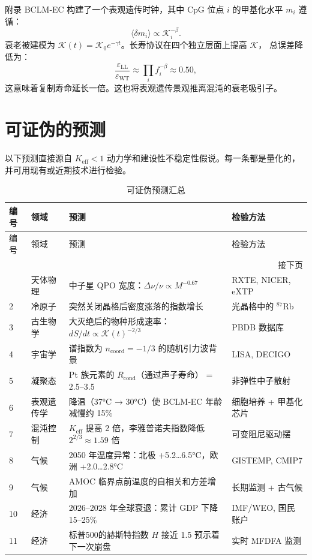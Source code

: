 \documentclass[12pt,a4paper]{article}
\newcommand{\Keff}{K_{\mathrm{eff}}}
\newcommand{\REL}{\mathcal{K}}
\begin{document}
	附录 BCLM‑EC 构建了一个表观遗传时钟，其中 CpG 位点 $i$ 的甲基化水平 $m_i$ 遵循：
	\[
	\langle \delta m_i \rangle \propto \REL_i^{-\beta}.
	\]
	衰老被建模为 $\REL(t) = \REL_0 e^{-\gamma t}$。长寿协议在四个独立层面上提高 $\REL$，
	总误差降低为：
	\[
	\frac{\varepsilon_{\mathrm{LL}}}{\varepsilon_{\mathrm{WT}}} \approx \prod_i f_i^{-\beta}
	\approx 0.50,
	\]
	这意味着复制寿命延长一倍。这也将表观遗传景观推离混沌的衰老吸引子。
	
	\section{可证伪的预测}
	
	以下预测直接源自 $\Keff < 1$ 动力学和建设性不稳定性假说。每一条都是量化的，
	并可用现有或近期技术进行检验。
	
	\begin{longtable}{|p{2cm}|p{3cm}|p{4.5cm}|p{4cm}|}
		\caption{可证伪预测汇总}\label{tab:predictions}\\
		\hline
		\textbf{编号} & \textbf{领域} & \textbf{预测} & \textbf{检验方法} \\
		\hline
		\endfirsthead
		\hline
		编号 & 领域 & 预测 & 检验方法 \\
		\hline
		\endhead
		\hline
		\multicolumn{4}{r}{接下页} \\
		\endfoot
		\hline
		\endlastfoot
		1 & 天体物理 & 中子星 QPO 宽度：$\Delta\nu/\nu \propto M^{-0.67}$ & RXTE, NICER, eXTP \\
		2 & 冷原子 & 突然关闭晶格后密度涨落的指数增长 & 光晶格中的 ${}^{87}$Rb \\
		3 & 古生物学 & 大灭绝后的物种形成速率：$dS/dt \propto \REL(t)^{-2/3}$ & PBDB 数据库 \\
		4 & 宇宙学 & 谱指数为 $n_{\mathrm{coord}} = -1/3$ 的随机引力波背景 & LISA, DECIGO \\
		5 & 凝聚态 & Pt 族元素的 $R_{\text{cond}}$（通过声子寿命） = 2.5–3.5 & 非弹性中子散射 \\
		6 & 表观遗传学 & 降温（37°C → 30°C）使 BCLM‑EC 年龄减慢约 15\% & 细胞培养 + 甲基化芯片 \\
		7 & 混沌控制 & $\Keff$ 提高 2 倍，李雅普诺夫指数降低 $2^{2/3} \approx 1.59$ 倍 & 可变阻尼驱动摆 \\
		8 & 气候 & 2050 年温度异常：北极 +5.2…6.5°C，欧洲 +2.0…2.8°C & GISTEMP, CMIP7 \\
		9 & 气候 & AMOC 临界点前温度的自相关和方差增加 & 长期监测 + 古气候 \\
		10 & 经济 & 2026–2028 年全球衰退：累计 GDP 下降 15–25\% & IMF/WEO, 国民账户 \\
		11 & 经济 & 标普500的赫斯特指数 $H$ 接近 1.5 预示着下一次崩盘 & 实时 MFDFA 监测 \\
	\end{longtable}
	
\end{document}
